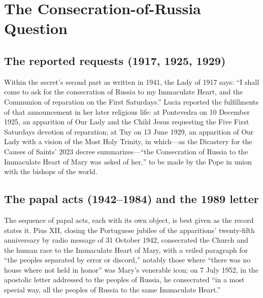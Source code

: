 \section{The Consecration-of-Russia Question}\label{sec:consecration}

\subsection{The reported requests (1917, 1925, 1929)}

Within the secret's second part as written in 1941, the Lady of 1917
says: ``I shall come to ask for the consecration of Russia to my
Immaculate Heart, and the Communion of reparation on the First
Saturdays.'' Lucia reported the fulfillments of that announcement in
her later religious life: at Pontevedra on 10 December 1925, an
apparition of Our Lady and the Child Jesus requesting the Five First
Saturdays devotion of reparation; at Tuy on 13 June 1929, an
apparition of Our Lady with a vision of the Most Holy Trinity, in
which---as the Dicastery for the Causes of Saints' 2023 decree
summarizes---``the Consecration of Russia to the Immaculate Heart of
Mary was asked of her,'' to be made by the Pope in union with the
bishops of the world.

\subsection{The papal acts (1942--1984) and the 1989 letter}

The sequence of papal acts, each with its own object, is best given
as the record states it. Pius XII, closing the Portuguese jubilee of
the apparitions' twenty-fifth anniversary by radio message of
31 October 1942, consecrated the Church and the human race to the
Immaculate Heart of Mary, with a veiled paragraph for ``the peoples
separated by error or discord,'' notably those where ``there was no
house where not held in honor'' was Mary's venerable icon; on 7 July
1952, in the apostolic letter  addressed to
the peoples of Russia, he consecrated ``in a most special way, all
the peoples of Russia to the same Immaculate Heart.''

